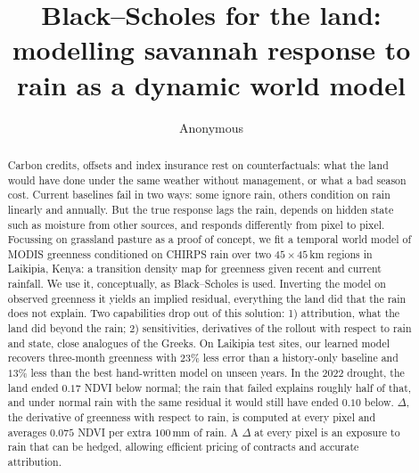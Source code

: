 \documentclass{article}
\title{Black--Scholes for the land:\\ modelling savannah response to rain as a dynamic world model}
\author{Anonymous}
\begin{document}
\maketitle

\begin{abstract}
Carbon credits, offsets and index insurance rest on counterfactuals: what the land would have done under the same weather without management, or what a bad season cost. Current baselines fail in two ways: some ignore rain, others condition on rain linearly and annually. But the true response lags the rain, depends on hidden state such as moisture from other sources, and responds differently from pixel to pixel. Focussing on grassland pasture as a proof of concept, we fit a temporal world model of MODIS greenness conditioned on CHIRPS rain over two $45\times45$\,km regions in Laikipia, Kenya: a transition density map for greenness given recent and current rainfall. We use it, conceptually, as Black--Scholes is used. Inverting the model on observed greenness it yields an implied residual, everything the land did that the rain does not explain. Two capabilities drop out of this solution: 1) attribution, what the land did beyond the rain; 2) sensitivities, derivatives of the rollout with respect to rain and state, close analogues of the Greeks. On Laikipia test sites, our learned model recovers three-month greenness with $23\%$ less error than a history-only baseline and $13\%$ less than the best hand-written model on unseen years. In the 2022 drought, the land ended $0.17$ NDVI below normal; the rain that failed explains roughly half of that, and under normal rain with the same residual it would still have ended $0.10$ below. $\Delta$, the derivative of greenness with respect to rain, is computed at every pixel and averages $0.075$ NDVI per extra $100$\,mm of rain. A $\Delta$ at every pixel is an exposure to rain that can be hedged, allowing efficient pricing of contracts and accurate attribution.
\end{abstract}
\end{document}
